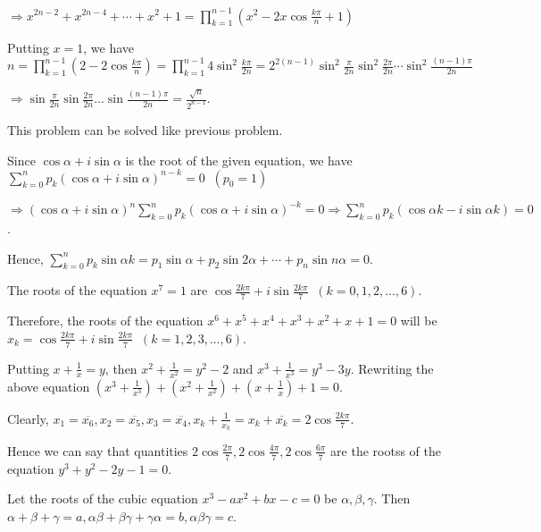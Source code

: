   $\Rightarrow x^{2n - 2} + x^{2n - 4} + \cdots + x^2 + 1 = \displaystyle\prod_{k = 1}^{n - 1}\left(x^2 -
  2x\cos\frac{k\pi}{n} + 1\right)$

  Putting $x = 1$, we have $n = \displaystyle\prod_{k = 1}^{n - 1}\left(2 - 2\cos\frac{k\pi}{n}\right) = \prod_{k=1}^{n
  - 1}4\sin^2\frac{k\pi}{2n} = 2^{2(n - 1)}\sin^2\frac{\pi}{2n}\sin^2\frac{2\pi}{2n}\cdots\sin^2\frac{(n -
    1)\pi}{2n}$

  $\Rightarrow \sin\frac{\pi}{2n}\sin\frac{2\pi}{2n}\ldots \sin\frac{(n - 1)\pi}{2n} = \frac{\sqrt{n}}{2^{n
      - 1}}$.
\item This problem can be solved like previous problem.
\item Since $\cos\alpha + i\sin\alpha$ is the root of the given equation, we have $\displaystyle\sum_{k =
  0}^np_k(\cos\alpha + i\sin\alpha)^{n - k} = 0\;\;(p_0 = 1)$

  $\Rightarrow \displaystyle(\cos\alpha + i\sin\alpha)^n\sum_{k=0}^np_k(\cos\alpha + i\sin\alpha)^{-k} = 0 \Rightarrow
  \sum_{k= 0}^np_k(\cos\alpha k - i\sin\alpha k) = 0$.

  Hence, $\displaystyle\sum_{k= 0}^np_k\sin\alpha k = p_1\sin\alpha + p_2\sin2\alpha + \cdots + p_n\sin
  n\alpha = 0$.
\item The roots of the equation $x^7 = 1$ are $\cos\frac{2k\pi}{7} + i\sin\frac{2k\pi}{7}\;\;(k = 0, 1, 2,
  \ldots, 6)$.

  Therefore, the roots of the equation $x^6 + x^5 + x^4 + x^3 + x^2 + x + 1 = 0$ will be $x_k =
  \cos\frac{2k\pi}{7} + i\sin\frac{2k\pi}{7}\;\;(k = 1, 2, 3, \ldots, 6)$.

  Putting $x + \frac{1}{x} = y$, then $x^2 + \frac{1}{x^2} = y^2 - 2$ and $x^3 + \frac{1}{x^3} = y^3 -
  3y$. Rewriting the above equation $\left(x^3 + \frac{1}{x^3}\right) + \left(x^2 + \frac{1}{x^2}\right) +
  \left(x + \frac{1}{x}\right) + 1 = 0$.

  Clearly, $x_1 = \overline{x_6}, x_2 = \overline{x_5}, x_3 = \overline{x_4}, x_k + \frac{1}{x_k} = x_k +
  \overline{x_k} = 2\cos\frac{2k\pi}{7}$.

  Hence we can say that quantities $2\cos\frac{2\pi}{7},
  2\cos\frac{4\pi}{7}, 2\cos\frac{6\pi}{7}$ are the rootss of the equation $y^3 + y^2 - 2y - 1 = 0$.

  Let the roots of the cubic equation $x^3 - ax^2 + bx - c = 0$ be $\alpha, \beta, \gamma$. Then $\alpha +
  \beta + \gamma = a, \alpha\beta + \beta\gamma + \gamma\alpha = b, \alpha\beta\gamma = c$.

